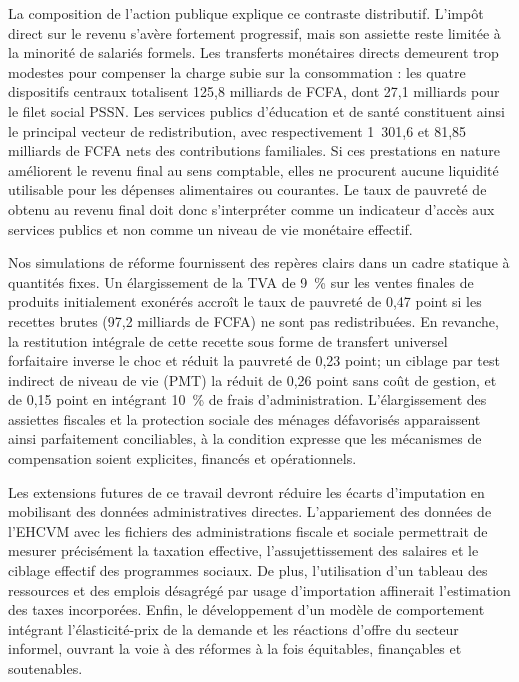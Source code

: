 \documentclass[11pt,a4paper]{article}
\begin{document}
La composition de l'action publique explique ce contraste distributif. L'impôt direct sur le revenu s'avère fortement progressif, mais son assiette reste limitée à la minorité de salariés formels. Les transferts monétaires directs demeurent trop modestes pour compenser la charge subie sur la consommation : les quatre dispositifs centraux totalisent 125,8 milliards de FCFA, dont 27,1 milliards pour le filet social PSSN. Les services publics d'éducation et de santé constituent ainsi le principal vecteur de redistribution, avec respectivement 1~301,6 et 81,85 milliards de FCFA nets des contributions familiales. Si ces prestations en nature améliorent le revenu final au sens comptable, elles ne procurent aucune liquidité utilisable pour les dépenses alimentaires ou courantes. Le taux de pauvreté de \PauvreteFinale{} obtenu au revenu final doit donc s'interpréter comme un indicateur d'accès aux services publics et non comme un niveau de vie monétaire effectif.

Nos simulations de réforme fournissent des repères clairs dans un cadre statique à quantités fixes. Un élargissement de la TVA de 9~\% sur les ventes finales de produits initialement exonérés accroît le taux de pauvreté de 0,47 point si les recettes brutes (97,2 milliards de FCFA) ne sont pas redistribuées. En revanche, la restitution intégrale de cette recette sous forme de transfert universel forfaitaire inverse le choc et réduit la pauvreté de 0,23 point; un ciblage par test indirect de niveau de vie (PMT) la réduit de 0,26 point sans coût de gestion, et de 0,15 point en intégrant 10~\% de frais d'administration. L'élargissement des assiettes fiscales et la protection sociale des ménages défavorisés apparaissent ainsi parfaitement conciliables, à la condition expresse que les mécanismes de compensation soient explicites, financés et opérationnels.

Les extensions futures de ce travail devront réduire les écarts d'imputation en mobilisant des données administratives directes. L'appariement des données de l'EHCVM avec les fichiers des administrations fiscale et sociale permettrait de mesurer précisément la taxation effective, l'assujettissement des salaires et le ciblage effectif des programmes sociaux. De plus, l'utilisation d'un tableau des ressources et des emplois désagrégé par usage d'importation affinerait l'estimation des taxes incorporées. Enfin, le développement d'un modèle de comportement intégrant l'élasticité-prix de la demande et les réactions d'offre du secteur informel, ouvrant la voie à des réformes à la fois équitables, finançables et soutenables.
\clearpage


\end{document}
